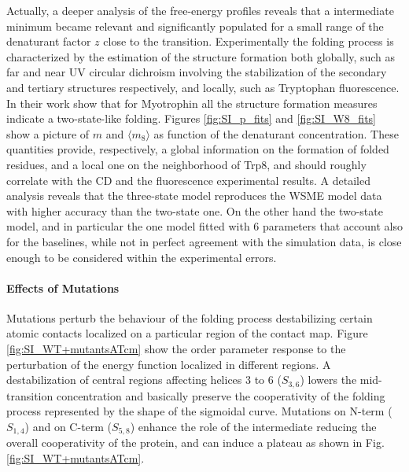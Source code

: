 Actually, a deeper analysis of the free-energy profiles reveals that a
intermediate minimum became relevant and significantly populated for a small
range of the denaturant factor $z$ close to the transition. 
Experimentally the folding process is characterized by the estimation of the
structure formation both globally, such as far and near UV circular dichroism
involving the stabilization of the secondary and tertiary structures
respectively, and locally, such as Tryptophan fluorescence.
In their work \citet{Lowe2007a} show that for Myotrophin all the structure
formation measures indicate a two-state-like folding.
Figures \ref{fig:SI_p_fits} and \ref{fig:SI_W8_fits} show a picture of $m$ and
$\langle m_8\rangle$ as function of the denaturant concentration.
These quantities provide, respectively, a global information on the formation of
folded residues, and a local one  on the neighborhood of Trp8, and should
roughly correlate with the CD and the fluorescence experimental results.
A detailed analysis reveals that the three-state model reproduces the WSME model
data with higher accuracy than the two-state one.
On the other hand the two-state model, and in particular the one model
fitted with 6 parameters that account also for the baselines, while not in
perfect agreement with the simulation data, is close enough to be
considered within the experimental errors.





\paragraph{Effects of Mutations}
Mutations perturb the behaviour of the folding process destabilizing certain
atomic contacts localized on a particular region of the contact map.
Figure \ref{fig:SI_WT+mutantsATcm} show the order parameter response to the
perturbation of the energy function localized in different regions.
A destabilization of central regions affecting helices 3 to 6 ($S_{3,6}$)
lowers the mid-transition concentration and basically preserve the cooperativity of the folding
process represented by the shape of the sigmoidal curve.
Mutations on N-term ($S_{1,4}$) and on C-term ($S_{5,8}$) enhance the role of
the intermediate reducing the overall cooperativity of the protein, and can
induce a plateau as shown in Fig. \ref{fig:SI_WT+mutantsATcm}.

